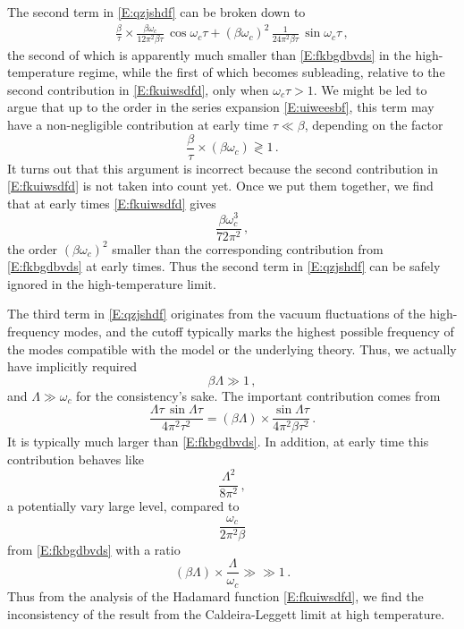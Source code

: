 \documentclass[11pt,a4paper]{article}
\begin{document}
The second term in \eqref{E:qzjshdf} can be broken down to
\begin{align}\label{E:fkuiwsdfd}
	\frac{\beta}{\tau}\times\frac{\beta\omega_{c}}{12\pi^{2}\beta\tau}\,\cos\omega_{c}\tau+(\beta\omega_{c})^{2}\,\frac{1}{24\pi^{2}\beta\tau}\,\sin\omega_{c}\tau\,,
\end{align}
the second of which is apparently much smaller than \eqref{E:fkbgdbvds} in the high-temperature regime, while the first of which becomes subleading, relative to the second contribution in \eqref{E:fkuiwsdfd}, only when $\omega_{c}\tau>1$. We might be led to argue that up to the order in the series expansion \eqref{E:uiweesbf}, this term may have a non-negligible contribution at early time $\tau\ll\beta$, depending on the factor
\begin{equation}
	\frac{\beta}{\tau}\times(\beta\omega_{c})\gtrless1\,.
\end{equation}
It turns out that this argument is incorrect because the second contribution in \eqref{E:fkuiwsdfd} is not taken into count yet. Once we put them together, we find that at early times \eqref{E:fkuiwsdfd} gives
\begin{equation}
	\frac{\beta\omega_{c}^{3}}{72\pi^{2}}\,,
\end{equation}
the order $(\beta\omega_{c})^{2}$ smaller than the corresponding contribution from \eqref{E:fkbgdbvds} at early times. Thus the second term in \eqref{E:qzjshdf} can be safely ignored in the high-temperature limit.



The third term in \eqref{E:qzjshdf} originates from the vacuum fluctuations of the high-frequency modes, and the cutoff typically marks the highest possible frequency of the modes compatible with the model or the underlying theory. Thus, we actually have implicitly required
\begin{equation}
	\beta\Lambda\gg1\,,
\end{equation}
and $\Lambda\gg\omega_{c}$ for the consistency's sake. The important contribution comes from
\begin{equation}
	\frac{\Lambda\tau\,\sin\Lambda\tau}{4\pi^{2}\tau^{2}}=(\beta\Lambda)\times\frac{\sin\Lambda\tau}{4\pi^{2}\beta\tau^{2}}\,.
\end{equation}
It is typically much larger than \eqref{E:fkbgdbvds}. In addition, at early time this contribution behaves like
\begin{equation}
	\frac{\Lambda^{2}}{8\pi^{2}}\,,
\end{equation}
a potentially vary large level, compared to
\begin{equation}
	\frac{\omega_{c}}{2\pi^{2}\beta}
\end{equation}
from \eqref{E:fkbgdbvds} with a ratio
\begin{equation}
	(\beta\Lambda)\times\frac{\Lambda}{\omega_{c}}\gg\gg1\,.
\end{equation}
Thus from the analysis of the Hadamard function \eqref{E:fkuiwsdfd}, we find the inconsistency of the result from the Caldeira-Leggett limit at high temperature. 
\end{document}
